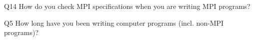 \begin{description}%
\item{Q14} How do you check MPI specifications when you are writing MPI programs?%
\item{Q5} How long have you been writing computer programs (incl. non-MPI programs)?%
\end{description}%
